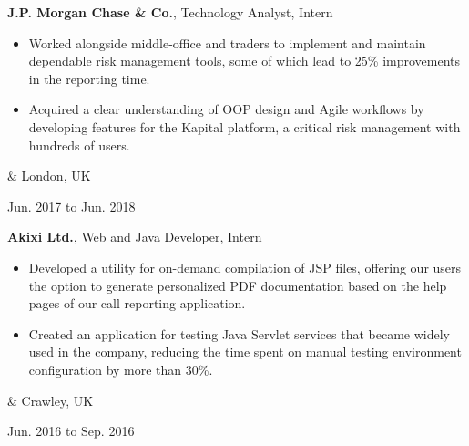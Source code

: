 \documentclass[10pt, letterpaper]{article}
\newenvironment{highlights}{
        \begin{itemize}[
                topsep=0pt,
                parsep=0.1 cm,
                partopsep=0pt,
                itemsep=0pt,
                after=\vspace{-1\baselineskip},
                leftmargin=0.7 cm + 3pt
            ]
    }{
        \end{itemize}
    } %
\let\originalTabularx\tabularx
\let\originalEndTabularx\endtabularx
\renewenvironment{tabularx}{\bgroup\centering\originalTabularx}{\originalEndTabularx\par\egroup}
\begin{document}
        \vspace{0.2 cm}
        \begin{tabularx}{
            \textwidth-0.2 cm-0.13cm
        }{
            K{0.1 cm}
            R{4.1 cm}
        }
            \textbf{J.P. Morgan Chase \& Co.}, Technology Analyst, Intern

            \vspace{0.1 cm}

            \begin{highlights}
                \item Worked alongside middle-office and traders to implement and maintain dependable risk management tools, some of which lead to 25\% improvements in the reporting time.
                \item Acquired a clear understanding of OOP design and Agile workflows by developing features for the Kapital platform, a critical risk management with hundreds of users.
            \end{highlights}
            &
            London, UK

            Jun. 2017 to Jun. 2018
        \end{tabularx}

        \vspace{0.2 cm}
        \begin{tabularx}{
            \textwidth-0.2 cm-0.13cm
        }{
            K{0.1 cm}
            R{4.1 cm}
        }
            \textbf{Akixi Ltd.}, Web and Java Developer, Intern

            \vspace{0.1 cm}

            \begin{highlights}
                \item Developed a utility for on-demand compilation of JSP files, offering our users the option to generate personalized PDF documentation based on the help pages of our call reporting application.
                \item Created an application for testing Java Servlet services that became widely used in the company, reducing the time spent on manual testing environment configuration by more than 30\%.
            \end{highlights}
            &
            Crawley, UK

            Jun. 2016 to Sep. 2016
        \end{tabularx}
\end{document}
